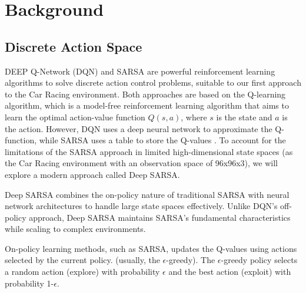 \documentclass[../CSC_52081_EP.tex]{subfiles}
\begin{document}
    \section{Background}
    \label{sec:background}




    \subsection{Discrete Action Space}

    DEEP Q-Network (DQN) and SARSA are powerful reinforcement learning algorithms to solve discrete action control problems, suitable to our first approach to the Car Racing environment.
    Both approaches are based on the Q-learning algorithm, which is a model-free reinforcement learning algorithm that aims to learn the optimal action-value function $Q(s, a)$, where $s$ is the state and $a$ is the action.
    However, DQN uses a deep neural network to approximate the Q-function, while SARSA uses a table to store the Q-values \cite{Popular_RL}. To account for the limitations of the SARSA approach in limited high-dimensional state spaces (as the Car Racing environment with an observation space of 96x96x3), we will explore a modern approach called Deep SARSA. \cite{Deep_SARSA}

    Deep SARSA combines the on-policy nature of traditional SARSA with neural network architectures to handle large state spaces effectively. Unlike DQN's off-policy approach, Deep SARSA maintains SARSA's fundamental characteristics while scaling to complex environments.

    On-policy learning methods, such as SARSA, updates the Q-values using actions selected by the current policy. (usually, the $\epsilon$-greedy).
    The $\epsilon$-greedy policy selects a random action (explore) with probability $\epsilon$ and the best action (exploit) with probability 1-$\epsilon$.
    
\end{document}
